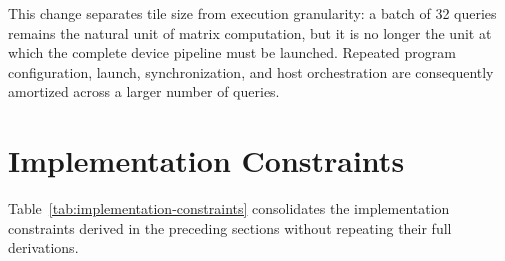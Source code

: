 This change separates tile size from execution granularity: a batch of 32 queries remains the natural unit of matrix computation, but it is no longer the unit at which the complete device pipeline must be launched. Repeated program configuration, launch, synchronization, and host orchestration are consequently amortized across a larger number of queries.

\section{Implementation Constraints}
\label{sec:implementation-constraints}

Table~\ref{tab:implementation-constraints} consolidates the implementation constraints derived in the preceding sections without repeating their full derivations.

